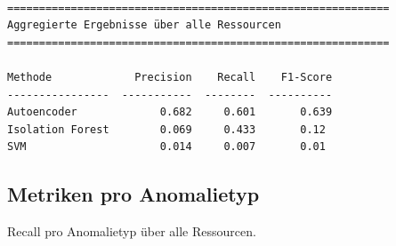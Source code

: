 \documentclass[11pt]{article}
\begin{document}
    \begin{Verbatim}[commandchars=\\\{\}]

============================================================
Aggregierte Ergebnisse über alle Ressourcen
============================================================

Methode             Precision    Recall    F1-Score
----------------  -----------  --------  ----------
Autoencoder             0.682     0.601       0.639
Isolation Forest        0.069     0.433       0.12
SVM                     0.014     0.007       0.01
    \end{Verbatim}

    \subsection{Metriken pro Anomalietyp}\label{metriken-pro-anomalietyp}

Recall pro Anomalietyp über alle Ressourcen.
\end{document}

